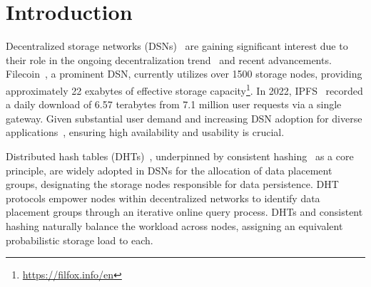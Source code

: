 \section{Introduction}
\label{sec:intro}


Decentralized storage networks (DSNs)~\cite{kubiatowicz2000oceanstore,ratnasamy2001scalable,benet2014ipfs,trautwein2022design,haeberlen2005glacier,filecoin} are gaining significant interest due to their role in the ongoing decentralization trend~\cite{bitcoin,ethereum} and recent advancements.
Filecoin~\cite{filecoin}, a prominent DSN, currently utilizes over 1500 storage nodes, providing approximately 22 exabytes of effective storage capacity\footnote{\url{https://filfox.info/en}}.
In 2022, IPFS~\cite{trautwein2022design} recorded a daily download of 6.57 terabytes from 7.1 million user requests via a single gateway.
Given substantial user demand and increasing DSN adoption for diverse applications~\cite{balduf2022dude,vorick2014sia,li2024sok}, ensuring high availability and usability is crucial.

Distributed hash tables (DHTs)~\cite{maymounkov2002kademlia,chord,rowstron2001pastry}, underpinned by consistent hashing~\cite{chash} as a core principle, are widely adopted in DSNs for the allocation of data placement groups, designating the storage nodes responsible for data persistence.
DHT protocols empower nodes within decentralized networks to identify data placement groups through an iterative online query process.
DHTs and consistent hashing naturally balance the workload across nodes, assigning an equivalent probabilistic storage load to each.
 


